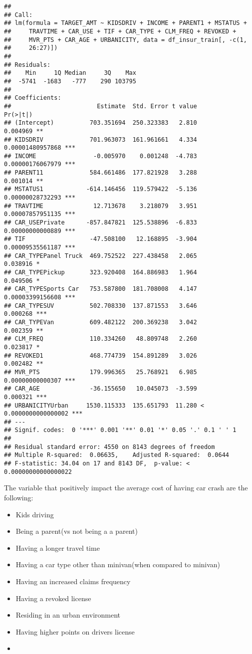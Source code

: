 \documentclass[
]{article}
\providecommand{\tightlist}{%
  \setlength{\itemsep}{0pt}\setlength{\parskip}{0pt}}
\begin{document}
\begin{verbatim}
## 
## Call:
## lm(formula = TARGET_AMT ~ KIDSDRIV + INCOME + PARENT1 + MSTATUS + 
##     TRAVTIME + CAR_USE + TIF + CAR_TYPE + CLM_FREQ + REVOKED + 
##     MVR_PTS + CAR_AGE + URBANICITY, data = df_insur_train[, -c(1, 
##     26:27)])
## 
## Residuals:
##    Min     1Q Median     3Q    Max 
##  -5741  -1683   -777    290 103795 
## 
## Coefficients:
##                        Estimate  Std. Error t value             Pr(>|t|)    
## (Intercept)          703.351694  250.323383   2.810             0.004969 ** 
## KIDSDRIV             701.963073  161.961661   4.334     0.00001480957868 ***
## INCOME                -0.005970    0.001248  -4.783     0.00000176067979 ***
## PARENT11             584.661486  177.821928   3.288             0.001014 ** 
## MSTATUS1            -614.146456  119.579422  -5.136     0.00000028732293 ***
## TRAVTIME              12.713678    3.218079   3.951     0.00007857951135 ***
## CAR_USEPrivate      -857.847821  125.538896  -6.833     0.00000000000889 ***
## TIF                  -47.508100   12.168895  -3.904     0.00009535561187 ***
## CAR_TYPEPanel Truck  469.752522  227.438458   2.065             0.038916 *  
## CAR_TYPEPickup       323.920408  164.886983   1.964             0.049506 *  
## CAR_TYPESports Car   753.587800  181.708008   4.147     0.00003399156608 ***
## CAR_TYPESUV          502.708330  137.871553   3.646             0.000268 ***
## CAR_TYPEVan          609.482122  200.369238   3.042             0.002359 ** 
## CLM_FREQ             110.334260   48.809748   2.260             0.023817 *  
## REVOKED1             468.774739  154.891289   3.026             0.002482 ** 
## MVR_PTS              179.996365   25.768921   6.985     0.00000000000307 ***
## CAR_AGE              -36.155650   10.045073  -3.599             0.000321 ***
## URBANICITYUrban     1530.115333  135.651793  11.280 < 0.0000000000000002 ***
## ---
## Signif. codes:  0 '***' 0.001 '**' 0.01 '*' 0.05 '.' 0.1 ' ' 1
## 
## Residual standard error: 4550 on 8143 degrees of freedom
## Multiple R-squared:  0.06635,    Adjusted R-squared:  0.0644 
## F-statistic: 34.04 on 17 and 8143 DF,  p-value: < 0.00000000000000022
\end{verbatim}

The variable that positively impact the average cost of having car crash
are the following:

\begin{itemize}
\tightlist
\item
  Kids driving
\item
  Being a parent(vs not being a a parent)
\item
  Having a longer travel time
\item
  Having a car type other than minivan(when compared to minivan)
\item
  Having an increased claims frequency
\item
  Having a revoked license
\item
  Residing in an urban environment
\item
  Having higher points on drivers license
\item
\end{itemize}
\end{document}
